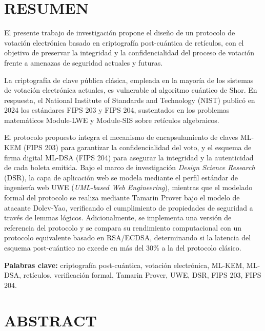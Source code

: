 \chapter*{RESUMEN}


El presente trabajo de investigación propone el diseño de un protocolo de votación electrónica basado en criptografía post-cuántica de retículos, con el objetivo de preservar la integridad y la confidencialidad del proceso de votación frente a amenazas de seguridad actuales y futuras.

La criptografía de clave pública clásica, empleada en la mayoría de los sistemas de votación electrónica actuales, es vulnerable al algoritmo cuántico de Shor. En respuesta, el National Institute of Standards and Technology (NIST) publicó en 2024 los estándares FIPS 203 y FIPS 204, sustentados en los problemas matemáticos Module-LWE y Module-SIS sobre retículos algebraicos.

El protocolo propuesto integra el mecanismo de encapsulamiento de claves ML-KEM (FIPS 203) para garantizar la confidencialidad del voto, y el esquema de firma digital ML-DSA (FIPS 204) para asegurar la integridad y la autenticidad de cada boleta emitida. Bajo el marco de investigación \textit{Design Science Research} (DSR), la capa de aplicación web se modela mediante el perfil estándar de ingeniería web UWE (\textit{UML-based Web Engineering}), mientras que el modelado formal del protocolo se realiza mediante Tamarin Prover bajo el modelo de atacante Dolev-Yao, verificando el cumplimiento de propiedades de seguridad a través de lemmas lógicos. Adicionalmente, se implementa una versión de referencia del protocolo y se compara su rendimiento computacional con un protocolo equivalente basado en RSA/ECDSA, determinando si la latencia del esquema post-cuántico no excede en más del 30\% a la del protocolo clásico.

\bigskip
\noindent\textbf{Palabras clave:} criptografía post-cuántica, votación electrónica, ML-KEM, ML-DSA, retículos, verificación formal, Tamarin Prover, UWE, DSR, FIPS 203, FIPS 204.

\bigskip

\chapter*{ABSTRACT}

